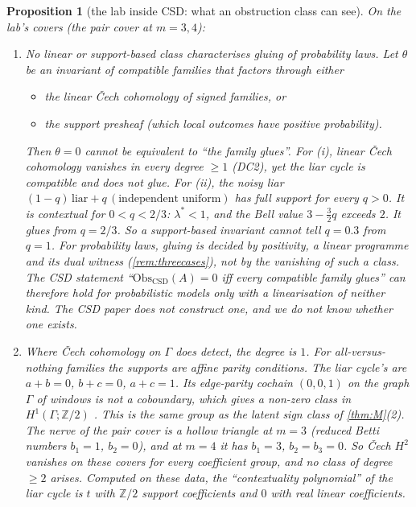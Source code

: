 \documentclass[11pt]{article}
\newtheorem{proposition}{Proposition}\newtheorem{corollary}{Corollary}\newtheorem{lemma}{Lemma}
\theoremstyle{definition}\newtheorem{definition}{Definition}\newtheorem{remark}{Remark}
\begin{document}
\begin{proposition}[the lab inside CSD: what an obstruction class can see]\label{prop:csd}
On the lab's covers (the pair cover at $m=3,4$):
\begin{enumerate}
\item[(1)] \emph{No linear or support-based class characterises gluing of probability laws.} Let $\theta$ be an invariant of compatible
  families that factors through either
  \begin{itemize}
  \item[(i)] the linear Čech cohomology of signed families, or
  \item[(ii)] the support presheaf (which local outcomes have positive probability).
  \end{itemize}
  Then $\theta=0$ cannot be equivalent to ``the family glues''. For (i), linear Čech cohomology vanishes in every degree $\ge1$ (DC2),
  yet the liar cycle is compatible and does not glue. For (ii), the noisy liar $(1-q)\,\mathrm{liar}+q\,(\text{independent uniform})$ has
  full support for every $q>0$. It is contextual for $0<q<2/3$: $\lambda^*<1$, and the Bell value $3-\tfrac32q$ exceeds $2$. It glues
  from $q=2/3$. So a support-based invariant cannot tell $q=0.3$ from $q=1$. For probability laws, gluing is decided by positivity, a
  linear programme and its dual witness (\cref{rem:threecases}), not by the vanishing of such a class. The CSD statement
  ``$\mathrm{Obs}_{\mathrm{CSD}}(A)=0$ iff every compatible family glues'' can therefore hold for probabilistic models only with a
  linearisation of neither kind. The CSD paper does not construct one, and we do not know whether one exists.
\item[(2)] \emph{Where Čech cohomology on $\Gamma$ does detect, the degree is $1$.} For all-versus-nothing families the supports are affine parity
  conditions. The liar cycle's are $a+b=0$, $b+c=0$, $a+c=1$. Its edge-parity cochain $(0,0,1)$ on the graph $\Gamma$ of windows is not a
  coboundary, which gives a non-zero class in $H^1(\Gamma;\mathbb Z/2)$ \cite{AbramskyMansfieldBarbosa2012}. This is the same group as
  the latent sign class of \cref{thm:M}(2). The nerve of the pair cover is a hollow triangle at $m=3$ (reduced Betti numbers $b_1=1$,
  $b_2=0$), and at $m=4$ it has $b_1=3$, $b_2=b_3=0$. So Čech $H^2$ vanishes on these covers for every coefficient group, and no class
  of degree $\ge2$ arises. Computed on these data, the ``contextuality polynomial'' of the liar cycle is $t$ with $\mathbb Z/2$ support
  coefficients and $0$ with real linear coefficients.

\end{enumerate}
\end{proposition}
\end{document}
